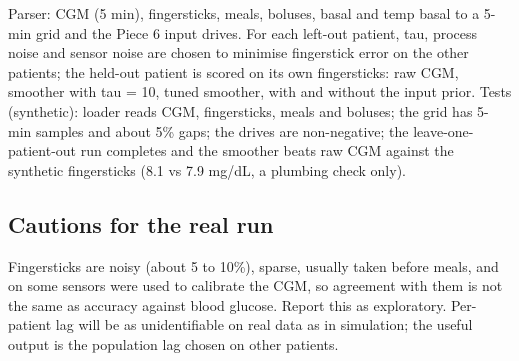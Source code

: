 \documentclass[11pt,a4paper]{article}
\begin{document}
Parser: CGM (5 min), fingersticks, meals, boluses, basal and temp basal
to a 5-min grid and the Piece 6 input drives. For each left-out patient,
tau, process noise and sensor noise are chosen to minimise fingerstick
error on the other patients; the held-out patient is scored on its own
fingersticks: raw CGM, smoother with tau = 10, tuned smoother, with and
without the input prior. Tests (synthetic): loader reads CGM,
fingersticks, meals and boluses; the grid has 5-min samples and about
5\% gaps; the drives are non-negative; the leave-one-patient-out run
completes and the smoother beats raw CGM against the synthetic
fingersticks (8.1 vs 7.9 mg/dL, a plumbing check only).

\hypertarget{cautions-for-the-real-run}{%
\subsection{Cautions for the real run}\label{cautions-for-the-real-run}}

Fingersticks are noisy (about 5 to 10\%), sparse, usually taken before
meals, and on some sensors were used to calibrate the CGM, so agreement
with them is not the same as accuracy against blood glucose. Report this
as exploratory. Per-patient lag will be as unidentifiable on real data
as in simulation; the useful output is the population lag chosen on
other patients.
\end{document}
